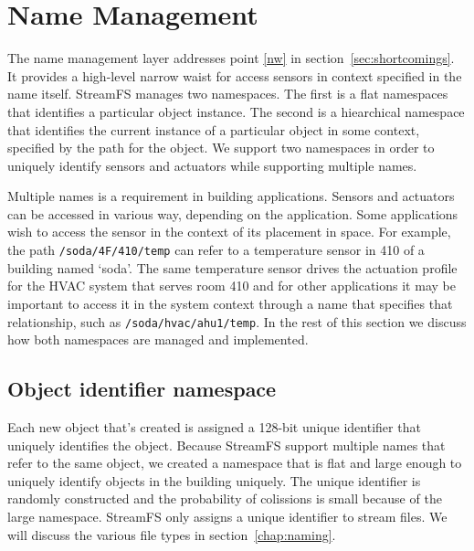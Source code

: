 \section{Name Management}
The name management layer addresses point \ref{nw} in section~\ref{sec:shortcomings}.  It provides a high-level
narrow waist for access sensors in context specified in the name itself.
StreamFS manages two namespaces.  The first is a flat namespaces that identifies a particular
object instance.  The second is a hiearchical namespace that identifies the current instance
of a particular object in some context, specified by the path for the object.  
We support two namespaces in order to uniquely identify sensors and actuators while supporting multiple names.

Multiple names is a requirement in building applications.  Sensors and actuators can be accessed in various 
way, depending on the application.  Some applications wish to access the sensor in the context of its placement 
in space.  For example, the path \texttt{/soda/4F/410/temp} can refer to a temperature sensor in 410 of a building
named `soda'.  The same temperature sensor drives the actuation profile for the HVAC system that serves room
410 and for other applications it may be important to access it in the system context through a name that specifies
that relationship, such as \texttt{/soda/hvac/ahu1/temp}.
In the rest of this section we discuss how both namespaces are managed and implemented.

\subsection{Object identifier namespace}

Each new object that's created is assigned a 128-bit unique identifier that uniquely identifies the object.
Because StreamFS support multiple names that refer to the same object, we created a namespace that is 
flat and large enough to uniquely identify objects in the building uniquely.  The unique identifier
is randomly constructed and the probability of colissions is small because of the large namespace.
StreamFS only assigns a unique identifier to stream files.  We will discuss the various file types in
section~\ref{chap:naming}.


